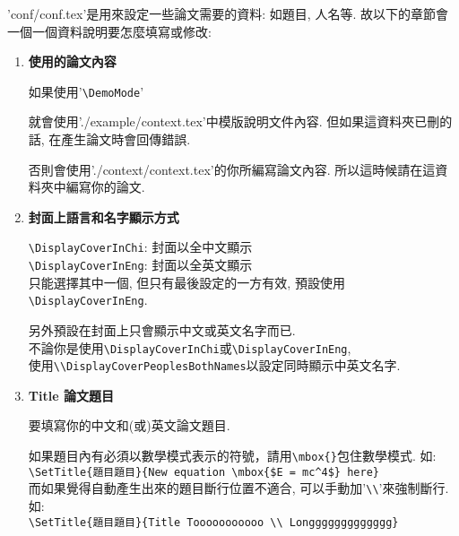 
'conf/conf.tex'是用來設定一些論文需要的資料: 如題目, 人名等. 故以下的章節會一個一個資料說明要怎麼填寫或修改:

\begin{enumerate}
  \item
  {
    \textbf{使用的論文內容}

    如果使用'\verb|\DemoMode|'

    就會使用'./example/context.tex'中模版說明文件內容. 但如果這資料夾已刪的話, 在產生論文時會回傳錯誤.

    否則會使用'./context/context.tex'的你所編寫論文內容. 所以這時候請在這資料夾中編寫你的論文.
  } %

  \item
  {
    \textbf{封面上語言和名字顯示方式}

    \verb|\DisplayCoverInChi|:  封面以全中文顯示\\
    \verb|\DisplayCoverInEng|:  封面以全英文顯示\\
    只能選擇其中一個, 但只有最後設定的一方有效, 預設使用\verb|\DisplayCoverInEng|.

    另外預設在封面上只會顯示中文或英文名字而已.\\
    不論你是使用\verb|\DisplayCoverInChi|或\verb|\DisplayCoverInEng|,\\
    使用\verb|\\DisplayCoverPeoplesBothNames|以設定同時顯示中英文名字.
  } %

  \item
  {
    \textbf{Title 論文題目}

    要填寫你的中文和(或)英文論文題目.

    如果題目內有必須以數學模式表示的符號，請用\verb|\mbox{}|包住數學模式. 如:\\
    \verb|\SetTitle{題目題目}{New equation \mbox{$E = mc^4$} here}|\\

    而如果覺得自動產生出來的題目斷行位置不適合, 可以手動加'\verb|\\|'來強制斷行. 如:\\
    \verb|\SetTitle{題目題目}{Title Tooooooooooo \\ Longgggggggggggg}|\\

}
\end{enumerate}
